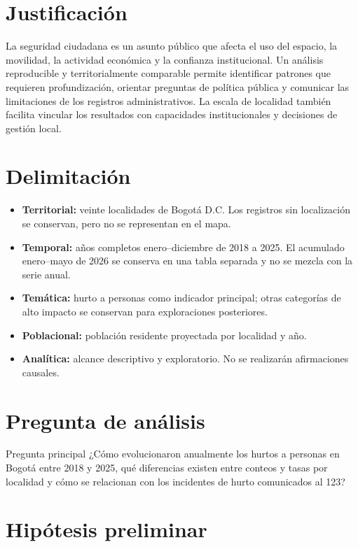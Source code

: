 \documentclass[11pt,letterpaper,oneside]{report}
\begin{document}
\section{Justificación}

La seguridad ciudadana es un asunto público que afecta el uso del espacio, la movilidad, la actividad económica y la confianza institucional. Un análisis reproducible y territorialmente comparable permite identificar patrones que requieren profundización, orientar preguntas de política pública y comunicar las limitaciones de los registros administrativos. La escala de localidad también facilita vincular los resultados con capacidades institucionales y decisiones de gestión local.

\section{Delimitación}

\begin{itemize}
  \item \textbf{Territorial:} veinte localidades de Bogotá D.C. Los registros sin localización se conservan, pero no se representan en el mapa.
  \item \textbf{Temporal:} años completos enero--diciembre de 2018 a 2025. El acumulado enero--mayo de 2026 se conserva en una tabla separada y no se mezcla con la serie anual.
  \item \textbf{Temática:} hurto a personas como indicador principal; otras categorías de alto impacto se conservan para exploraciones posteriores.
  \item \textbf{Poblacional:} población residente proyectada por localidad y año.
  \item \textbf{Analítica:} alcance descriptivo y exploratorio. No se realizarán afirmaciones causales.
\end{itemize}

\section{Pregunta de análisis}

\begin{keybox}{Pregunta principal}
¿Cómo evolucionaron anualmente los hurtos a personas en Bogotá entre 2018 y 2025, qué diferencias existen entre conteos y tasas por localidad y cómo se relacionan con los incidentes de hurto comunicados al 123?
\end{keybox}

\section{Hipótesis preliminar}
\end{document}
